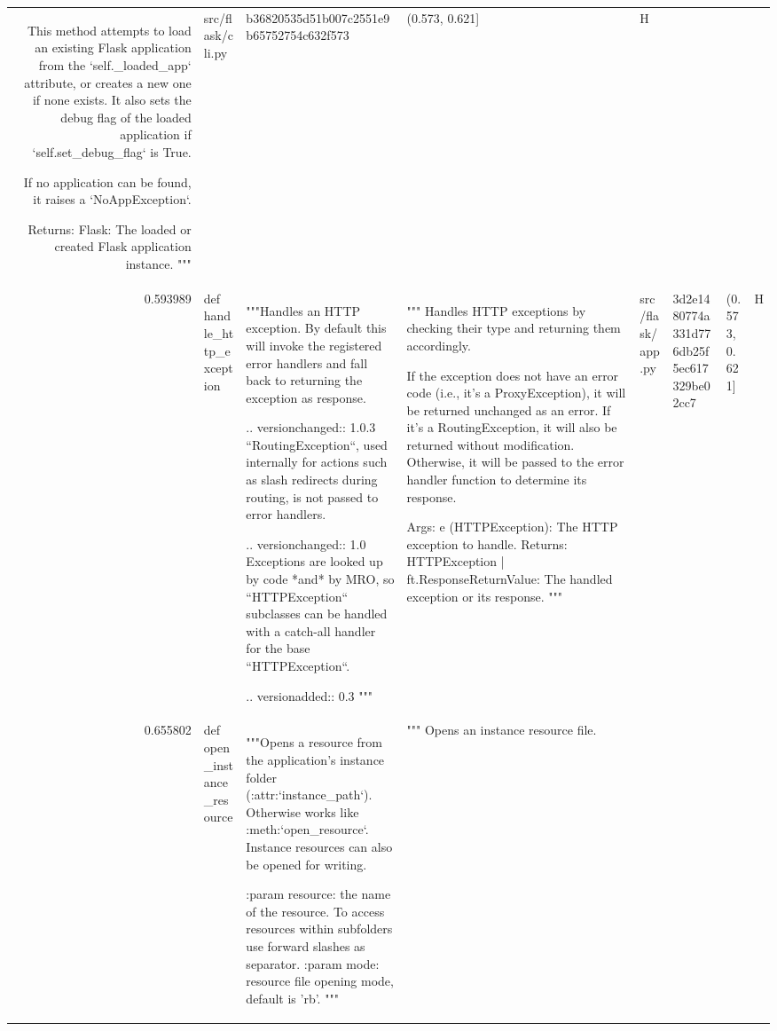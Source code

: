 \begin{tabular}{rlllllll}
This method attempts to load an existing Flask application from the `self._loaded_app` attribute,
or creates a new one if none exists. It also sets the debug flag of the loaded application
if `self.set_debug_flag` is True.

If no application can be found, it raises a `NoAppException`.

Returns:
    Flask: The loaded or created Flask application instance.
""" & src/flask/cli.py & b36820535d51b007c2551e9b65752754c632f573 & (0.573, 0.621] & H \\
0.593989 & def handle_http_exception & """Handles an HTTP exception.  By default this will invoke the
        registered error handlers and fall back to returning the
        exception as response.

        .. versionchanged:: 1.0.3
            ``RoutingException``, used internally for actions such as
             slash redirects during routing, is not passed to error
             handlers.

        .. versionchanged:: 1.0
            Exceptions are looked up by code *and* by MRO, so
            ``HTTPException`` subclasses can be handled with a catch-all
            handler for the base ``HTTPException``.

        .. versionadded:: 0.3
        """ & """
Handles HTTP exceptions by checking their type and returning them accordingly.

If the exception does not have an error code (i.e., it's a ProxyException), 
it will be returned unchanged as an error. If it's a RoutingException, 
it will also be returned without modification. Otherwise, it will be 
passed to the error handler function to determine its response.

Args:
    e (HTTPException): The HTTP exception to handle.
Returns:
    HTTPException | ft.ResponseReturnValue: The handled exception or its response.
""" & src/flask/app.py & 3d2e1480774a331d776db25f5ec617329be02cc7 & (0.573, 0.621] & H \\
0.655802 & def open_instance_resource & """Opens a resource from the application's instance folder
        (:attr:`instance_path`).  Otherwise works like
        :meth:`open_resource`.  Instance resources can also be opened for
        writing.

        :param resource: the name of the resource.  To access resources within
                         subfolders use forward slashes as separator.
        :param mode: resource file opening mode, default is 'rb'.
        """ & """
Opens an instance resource file.


\end{tabular}
